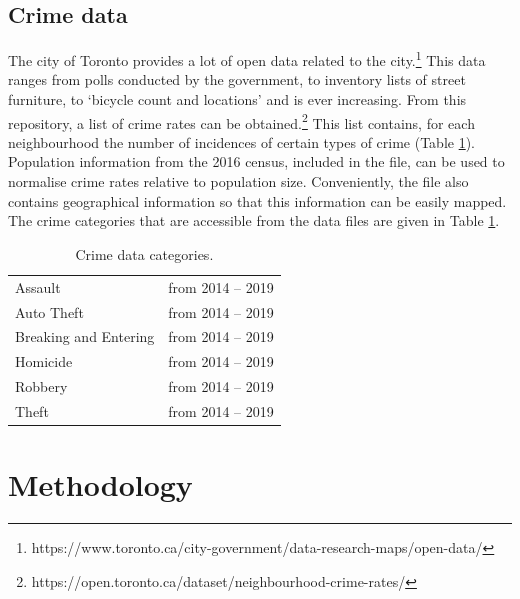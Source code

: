 \documentclass{article}
\begin{document}
\subsection{Crime data}
The city of Toronto provides a lot of open data related to the city.\footnote{https://www.toronto.ca/city-government/data-research-maps/open-data/} This data ranges from polls conducted by the government, to inventory lists of street furniture, to `bicycle count and locations' and is ever increasing. From this repository, a list of crime rates can be obtained.\footnote{https://open.toronto.ca/dataset/neighbourhood-crime-rates/} This list contains, for each neighbourhood the number of incidences of certain types of crime (Table \ref{tab:crime}). Population information from the 2016 census, included in the file, can be used to normalise crime rates relative to population size. Conveniently, the file also contains geographical information so that this information can be easily mapped. The crime categories that are accessible from the data files are given in Table \ref{tab:crime}.
\begin{table}[ht]
\centering
    \begin{tabular}{ll}
    \hline\hline
        Assault &  from 2014 -- 2019\\
        Auto Theft &  from 2014 -- 2019\\
        Breaking and Entering &  from 2014 -- 2019\\
        Homicide &  from 2014 -- 2019\\
        Robbery &  from 2014 -- 2019\\
        Theft &  from 2014 -- 2019\\
    \hline
    \end{tabular}
\caption{Crime data categories.}\label{tab:crime}
\end{table}


\section{Methodology}
\end{document}
